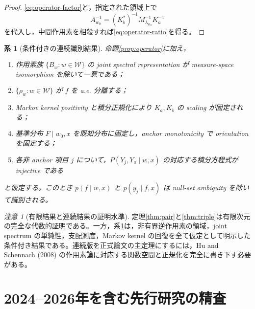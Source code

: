 \documentclass[11pt,a4paper]{ltjsarticle}
\newtheorem{corollary}{系}[section]
\theoremstyle{remark}\newtheorem{remark}{注意}[section]
\newcommand{\cW}{\mathcal W}
\begin{document}
\begin{proof}
\eqref{eq:operator-factor}と，指定された領域上で
\[
A_{w_0}^{-1}=(K_b^*)^{-1}M_{\lambda_{w_0}}^{-1}K_a^{-1}
\]
を代入し，中間作用素を相殺すれば\eqref{eq:operator-ratio}を得る。
\end{proof}

\begin{corollary}[条件付きの連続識別結果]\label{cor:continuous}
命題\ref{prop:operator}に加え，
\begin{enumerate}[label=(C\arabic*)]
\item 作用素族 $\{B_w:w\in\cW\}$ の joint spectral representation が measure-space isomorphism を除いて一意である；
\item $\{\rho_w:w\in\cW\}$ が $f$ を a.e. 分離する；
\item Markov kernel positivity と積分正規化により $K_a,K_b$ の scaling が固定される；
\item 基準分布 $F\mid w_0,x$ を既知分布に固定し，anchor monotonicity で orientation を固定する；
\item 各非 anchor 項目 $j$ について，$P(Y_j,Y_a\mid w,x)$ の対応する積分方程式が injective である
\end{enumerate}
と仮定する。このとき $p(f\mid w,x)$ と $p(y_j\mid f,x)$ は null-set ambiguity を除いて識別される。
\end{corollary}

\begin{remark}[有限結果と連続結果の証明水準]
定理\ref{thm:pair}と\ref{thm:triple}は有限次元の完全な代数的証明である。一方，系\ref{cor:continuous}は，非有界逆作用素の領域，joint spectrum の単純性，支配測度，Markov kernel の回復を全て仮定として明示した条件付き結果である。連続版を正式論文の主定理にするには，Hu and Schennach (2008) の作用素論に対応する関数空間と正規化を完全に書き下す必要がある。
\end{remark}

\section{2024--2026年を含む先行研究の精査}
\end{document}
